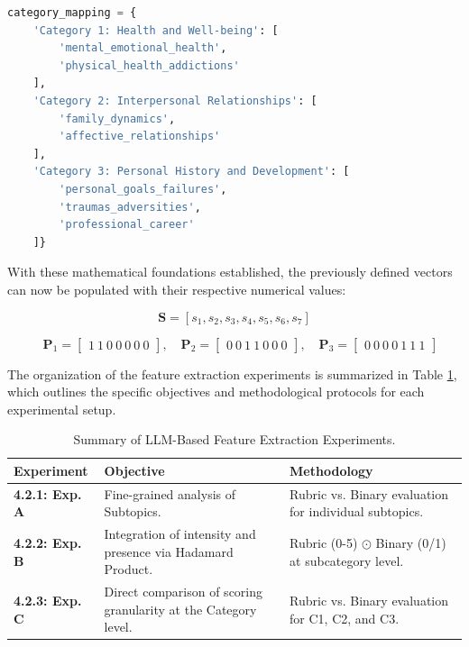 \begin{lstlisting}[language=Python, caption={Mapping of Subtopics to SPT Categories.}, label={lst:mapping_categories}, frame=single, basicstyle=\small\ttfamily]
category_mapping = {
    'Category 1: Health and Well-being': [
        'mental_emotional_health', 
        'physical_health_addictions'
    ],
    'Category 2: Interpersonal Relationships': [
        'family_dynamics', 
        'affective_relationships'
    ],
    'Category 3: Personal History and Development': [
        'personal_goals_failures', 
        'traumas_adversities', 
        'professional_career'
    ]}
\end{lstlisting}

With these mathematical foundations established, the previously defined vectors can now be populated with their respective numerical values:

\begin{equation}
\mathbf{S} = [s_1, s_2, s_3, s_4, s_5, s_6, s_7]
\end{equation}

\begin{equation}
\quad \mathbf{P}_1 = \begin{bmatrix} 1 \ 1 \ 0 \ 0 \ 0 \ 0 \ 0 \end{bmatrix}, \quad \mathbf{P}_2 = \begin{bmatrix} 0 \ 0 \ 1 \ 1 \ 0 \ 0 \ 0 \end{bmatrix}, \quad \mathbf{P}_3 = \begin{bmatrix} 0 \ 0 \ 0 \ 0 \ 1 \ 1 \ 1 \end{bmatrix}
\end{equation}


The organization of the feature extraction experiments is summarized in Table \ref{tab:llm_experiments}, which outlines the specific objectives and methodological protocols for each experimental setup.


\begin{table}[htbp]
\centering
\caption{Summary of LLM-Based Feature Extraction Experiments.}
\label{tab:llm_experiments}
\begin{tabular}{@{}lp{6cm}p{4.5cm}@{}}
\toprule
\textbf{Experiment} & \textbf{Objective} & \textbf{Methodology} \\ \midrule

\textbf{4.2.1: Exp. A} & Fine-grained analysis of Subtopics. & Rubric vs. Binary evaluation for individual subtopics. \\

\textbf{4.2.2: Exp. B} & Integration of intensity and presence via Hadamard Product. & Rubric (0-5) $\odot$ Binary (0/1) at subcategory level. \\

\textbf{4.2.3: Exp. C} & Direct comparison of scoring granularity at the Category level. & Rubric vs. Binary evaluation for C1, C2, and C3. \\
 \bottomrule
\end{tabular}
\end{table}



